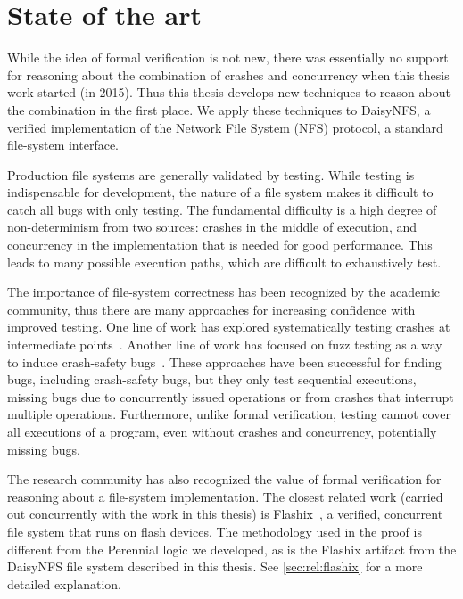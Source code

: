 \section{State of the art}
\label{sec:intro:related}

While the idea of formal verification is not new, there was essentially no
support for reasoning about the combination of crashes and concurrency when this
thesis work started (in 2015). Thus this thesis develops new techniques to
reason about the combination in the first place. We apply these techniques to
DaisyNFS, a verified implementation of the Network File System (NFS) protocol, a
standard file-system interface.

Production file systems are generally validated by testing. While testing is
indispensable for development, the nature of a file system makes it difficult to
catch all bugs with only testing. The fundamental difficulty is a high degree of
non-determinism from two sources: crashes in the middle of execution, and
concurrency in the implementation that is needed for good performance. This
leads to many possible execution paths, which are difficult to exhaustively test.

The importance of file-system correctness has been recognized by the academic
community, thus there are many approaches for increasing confidence with
improved testing. One line of work has explored systematically testing crashes
at intermediate points~\cite{mohan:crashmonkey,pillai:appcrash,yang:explode}. Another line of
work has focused on fuzz testing as a way to induce crash-safety
bugs~\cite{xu:janus,kim:hydra}. These approaches have been successful for
finding bugs, including crash-safety bugs, but they only test sequential
executions, missing bugs due to concurrently issued operations or from crashes
that interrupt multiple operations. Furthermore, unlike formal verification, testing cannot
cover all executions of a program, even without crashes and concurrency,
potentially missing bugs.

The research community has also recognized the value of formal verification for
reasoning about a file-system implementation. The closest related work
(carried out concurrently with the work in this thesis) is
Flashix~\cite{bodenmuller:concurrent-flashix}, a verified, concurrent file
system that runs on flash devices. The methodology used in the proof is
different from the Perennial logic we developed, as is the Flashix artifact from
the DaisyNFS file system described in this thesis. See \cref{sec:rel:flashix}
for a more detailed explanation.

